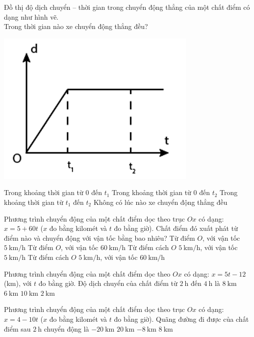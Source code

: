 \begin{ex}
	Đồ thị độ dịch chuyển – thời gian trong chuyển động thẳng của một chất điểm có dạng như hình vẽ.\\
	Trong thời gian nào xe chuyển động thẳng đều?
	\begin{center}
		\includegraphics[width=0.25\linewidth]{figs/VN10-2023-PH-TP005-P-4}
	\end{center}
	\choice
	{\True Trong khoảng thời gian từ $0$ đến $t_1$}
	{Trong khoảng thời gian từ $0$ đến $t_2$}
	{Trong khoảng thời gian từ $t_1$ đến $t_2$}
	{Không có lúc nào xe chuyển động thẳng đều}
	\loigiai{}
\end{ex}
\begin{ex}
	Phương trình chuyển động của một chất điểm dọc theo trục $Ox$ có dạng: $x = 5 + 60t$ ($x$ đo bằng kilomét và $t$ đo bằng giờ). Chất điểm đó xuất phát từ điểm nào và chuyển động với vận tốc bằng bao nhiêu?
	\choice
	{Từ điểm $O$, với vận tốc $\SI{5}{\kilo\meter/\hour}$}
	{Từ điểm $O$, với vận tốc $\SI{60}{\kilo\meter/\hour}$}
	{Từ điểm cách $O$ $\SI{5}{\kilo\meter/\hour}$, với vận tốc $\SI{5}{\kilo\meter/\hour}$}
	{\True Từ điểm cách $O$ $\SI{5}{\kilo\meter/\hour}$, với vận tốc $\SI{60}{\kilo\meter/\hour}$}
	\loigiai{}
\end{ex}
\begin{ex}
Phương trình chuyển động của một chất điểm dọc theo $Ox$ có dạng: $x=5t-12$ (km), với $t$ đo bằng giờ. Độ dịch chuyển của chất điểm từ $\SI{2}{\hour}$ đến $\SI{4}{\hour}$ là	
	\choice
	{$\SI{8}{\kilo\meter}$}
	{$\SI{6}{\kilo\meter}$}
	{\True $\SI{10}{\kilo\meter}$}
	{$\SI{2}{\kilo\meter}$}
	\loigiai{}
\end{ex}
\begin{ex}
	Phương trình chuyển động của một chất điểm dọc theo trục $Ox$ có dạng: $x = 4 -10t$ ($x$ đo bằng kilomét và $t$ đo bằng giờ). Quãng đường đi được của chất điểm sau $\SI{2}{\hour}$ chuyển động là
	\choice
	{$\SI{-20}{\kilo\meter}$}
	{\True $\SI{20}{\kilo\meter}$}
	{$\SI{-8}{\kilo\meter}$}
	{$\SI{8}{\kilo\meter}$}
	\loigiai{}
\end{ex}

